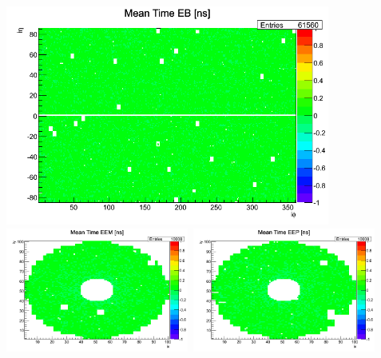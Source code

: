 \begin{minipage}{0.90\linewidth}
\begin{center}
\mbox{\includegraphics[height=0.50\textwidth, width=0.80\textwidth]{THESISPLOTS/calibDiffMapEB_After_Calibration.png}}
\mbox{\includegraphics[height=0.52\textwidth, width=0.45\textwidth]{THESISPLOTS/calibDiffMapEEM_AFter_CALIB.png} \quad
\includegraphics[height=0.52\textwidth, width=0.45\textwidth]{THESISPLOTS/calibDiffMapEEP_After_CALIB.png}
}
\label{fig:TimeCalibaf}
\end{center}
\end{minipage}

